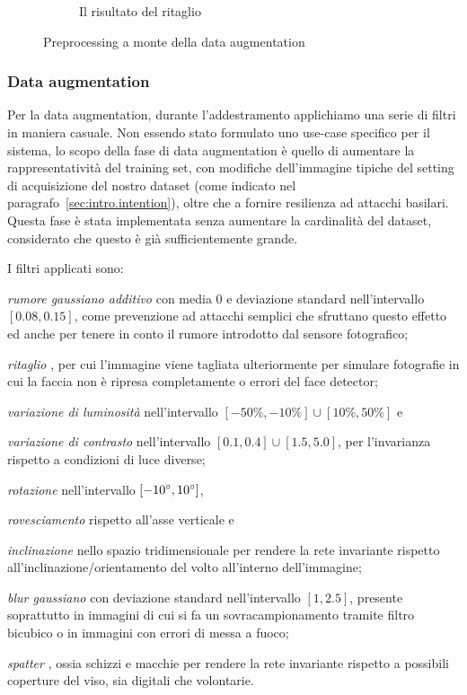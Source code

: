 \begin{figure}
\begin{subfigure}{0.3\textwidth}
\caption{Il risultato del ritaglio}
\label{sfig:preprocessed}
\end{subfigure}
\caption{Preprocessing a monte della data augmentation}
\label{fig:preprocessing}
\end{figure}

\subsubsection{Data augmentation}
\label{sec:data_augmentation}

Per la data augmentation, durante l'addestramento applichiamo una serie di filtri in maniera casuale. Non essendo stato formulato uno use-case specifico per il sistema, lo scopo della fase di data augmentation è quello di aumentare la rappresentatività del training set, con modifiche dell'immagine tipiche del setting di acquisizione del nostro dataset (come indicato nel paragrafo~\ref{sec:intro.intention}), oltre che a fornire resilienza ad attacchi basilari. Questa fase è stata implementata senza aumentare la cardinalità del dataset, considerato che questo è già sufficientemente grande.

I filtri applicati sono:
\begin{enumerate*}[label={(\arabic*)}]
\item \emph{rumore gaussiano additivo} con media 0 e deviazione standard nell'intervallo $[0.08, 0.15]$, come prevenzione ad attacchi semplici che sfruttano questo effetto ed anche per tenere in conto il rumore introdotto dal sensore fotografico;
\item \emph{ritaglio} \cite{miviagender}, per cui l'immagine viene tagliata ulteriormente per simulare fotografie in cui la faccia non è ripresa completamente o errori del face detector;
\item \emph{variazione di luminosità} nell'intervallo $[-50\%, -10\%] \cup [10\%, 50\%]$ e \item \emph{variazione di contrasto} nell'intervallo $[0.1, 0.4] \cup [1.5, 5.0]$, per l'invarianza rispetto a condizioni di luce diverse;
\item \emph{rotazione} nell'intervallo $[-10 \degree, 10 \degree ]$, \item \emph{rovesciamento} rispetto all'asse verticale e \item \emph{inclinazione} \cite{miviagender} nello spazio tridimensionale per rendere la rete invariante rispetto all'inclinazione/orientamento del volto all'interno dell'immagine;
\item \emph{blur gaussiano} con deviazione standard nell'intervallo $[1, 2.5]$, presente soprattutto in immagini di cui si fa un sovracampionamento tramite filtro bicubico o in immagini con errori di messa a fuoco;
\item \emph{spatter} \cite{miviagender}, ossia schizzi e macchie per rendere la rete invariante rispetto a possibili coperture del viso, sia digitali che volontarie.
\end{enumerate*}

